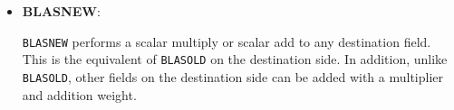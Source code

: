 \begin{itemize}
%
%

\item {\bf BLASNEW}:
 
  {\tt BLASNEW} performs a scalar multiply or scalar add to any
  destination field.  This is the equivalent of {\tt BLASOLD} on the
  destination side.  In addition, unlike {\tt BLASOLD}, other fields on the
  destination side can be added with a multiplier and addition weight.


\end{itemize}
